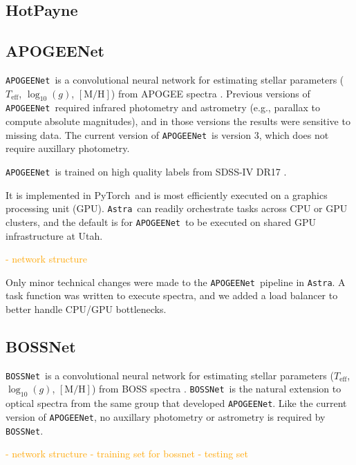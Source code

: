 \documentclass[modern]{aastex631}
\newcommand{\astra}{\texttt{Astra}}
\newcommand{\Astra}{\astra}
\newcommand{\pipeline}[1]{\texttt{#1}}
\newcommand{\APOGEENet}{\pipeline{APOGEENet}}
\newcommand{\BOSSNet}{\pipeline{BOSSNet}}
\newcommand{\pytorch}{PyTorch}
\newcommand{\todo}[1]{\textcolor{orange}{#1}}
\newcommand{\teff}{T_\mathrm{eff}}
\newcommand{\logg}{\log_{10}(g)}
\newcommand{\mh}{[\mathrm{M/H}]}
\begin{document}


\subsection{HotPayne} \label{sec:methods-hot-payne}

\subsection{APOGEENet} \label{sec:methods-apogee-net}

\APOGEENet\ is a convolutional neural network for estimating stellar parameters ($\teff$, $\logg$, $\mh$) from APOGEE spectra \citep{apogeenet}. Previous versions of \APOGEENet\ required infrared photometry and astrometry (e.g., parallax to compute absolute magnitudes), and in those versions the results were sensitive to missing data. The current version of \APOGEENet\ is version 3, which does not require auxillary photometry. 

\APOGEENet\ is trained on high quality labels from SDSS-IV DR17 \citep{dr17}. 

It is implemented in \pytorch\ and is most efficiently executed on a graphics processing unit (GPU). \Astra\ can readily orchestrate tasks across CPU or GPU clusters, and the default is for \APOGEENet\ to be executed on shared GPU infrastructure at Utah.

\todo{- network structure}

Only minor technical changes were made to the \APOGEENet\ pipeline in \Astra. A task function was written to execute spectra, and we added a load balancer to better handle CPU/GPU bottlenecks.

\subsection{BOSSNet} \label{sec:methods-boss-net}

\BOSSNet\ is a convolutional neural network for estimating stellar parameters ($\teff$, $\logg$, $\mh$) from BOSS spectra \citep{bossnet}. \BOSSNet\ is the natural extension to optical spectra from the same group that developed \APOGEENet. Like the current version of \APOGEENet, no auxillary photometry or astrometry is required by \BOSSNet.

\todo{
- network structure
- training set for bossnet
- testing set
}
\end{document}
